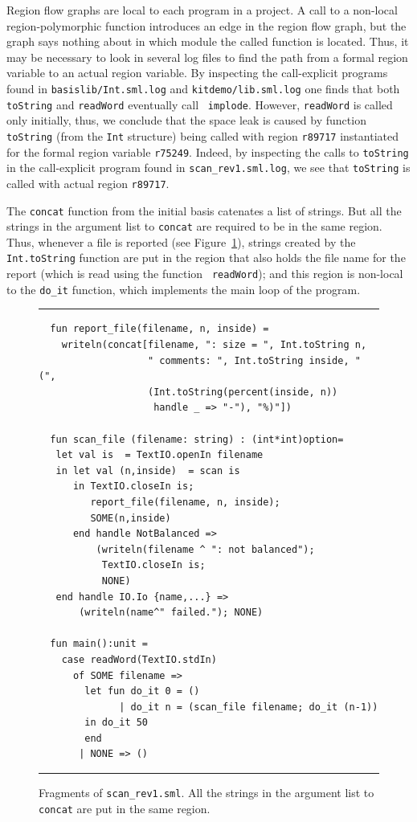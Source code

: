\documentclass[12pt]{book}
\begin{document}
Region flow graphs are local to each program in a project. A call to a
non-local region-polymorphic function introduces an edge in the region
flow graph, but the graph says nothing about in which module the
called function is located. Thus, it may be necessary to look in
several log files to find the path from a formal region variable to an
actual region variable. By inspecting the call-explicit programs found
in {\tt basislib/Int.sml.log} and {\tt kitdemo/lib.sml.log} one finds
that both {\tt toString} and {\tt readWord} eventually call {\tt
  implode}. However, {\tt readWord} is called only initially, thus, we
conclude that the space leak is caused by function {\tt toString}
(from the {\tt Int} structure) being called with region {\tt r89717}
instantiated for the formal region variable {\tt r75249}. Indeed, by
inspecting the calls to {\tt toString} in the call-explicit program
found in {\tt scan\_rev1.sml.log}, we see that {\tt toString} is called
with actual region {\tt r89717}. 

The {\tt concat} function from the initial basis catenates a list of
strings. But all the strings in the argument list to {\tt concat} are
required to be in the same region. Thus, whenever a file is reported
(see Figure~\ref{report_file.fig}), strings created by the {\tt
  Int.toString} function are put in the region that also holds the
file name for the report (which is read using the function {\tt
  readWord}); and this region is non-local to the {\tt do\_it}
function, which implements the main loop of the program.
\begin{figure}
\hrule \medskip
\begin{verbatim}
  fun report_file(filename, n, inside) = 
    writeln(concat[filename, ": size = ", Int.toString n, 
                   " comments: ", Int.toString inside, " (",
                   (Int.toString(percent(inside, n)) 
                    handle _ => "-"), "%)"])

  fun scan_file (filename: string) : (int*int)option=
   let val is  = TextIO.openIn filename 
   in let val (n,inside)  = scan is
      in TextIO.closeIn is; 
         report_file(filename, n, inside);
         SOME(n,inside)
      end handle NotBalanced => 
          (writeln(filename ^ ": not balanced");
           TextIO.closeIn is;
           NONE)
   end handle IO.Io {name,...} => 
       (writeln(name^" failed."); NONE)
  
  fun main():unit =
    case readWord(TextIO.stdIn)
      of SOME filename =>
        let fun do_it 0 = ()
              | do_it n = (scan_file filename; do_it (n-1))
        in do_it 50
        end
       | NONE => ()
\end{verbatim}
\caption{Fragments of {\tt scan\_rev1.sml}. All the strings in the 
  argument list to {\tt concat} are put in the same region.}
\label{report_file.fig}
\medskip \hrule
\end{figure}
\end{document}
